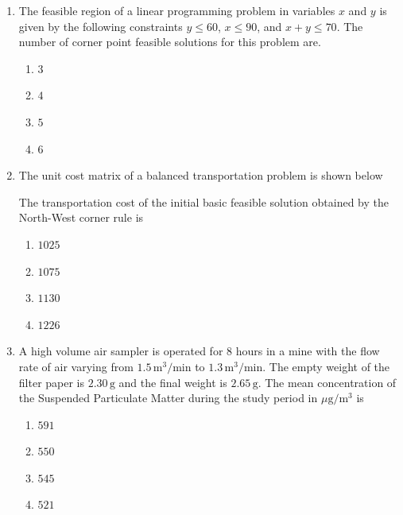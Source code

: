 \documentclass[journal,12pt,onecolumn]{IEEEtran}
\theoremstyle{remark}
\begin{document}
\begin{enumerate}
\item The feasible region of a linear programming problem in variables $x$ and $y$ is given by the following constraints  
$y \leq 60$, $x \leq 90$, and $x + y \leq 70$.
The number of corner point feasible solutions for this problem are.
\

\hfill{}

\begin{multicols}{4}
\begin{enumerate}
\item $3$
\item $4$
\item $5$
\item $6$
\end{enumerate}
\end{multicols}

\item The unit cost matrix of a balanced transportation problem is shown below
\begin{table}[H]
\centering

\end{table}
The transportation cost of the initial basic feasible solution obtained by the North-West corner rule is 

\hfill{}
\begin{multicols}{4}
\begin{enumerate}
\item $1025$
\item $1075$
\item $1130$
\item $1226$
\end{enumerate}
\end{multicols}

\item A high volume air sampler is operated for 8 hours in a mine with the flow rate of air varying from 
$1.5\, \mathrm{m}^3/\mathrm{min}$ to $1.3\, \mathrm{m}^3/\mathrm{min}$. The empty weight of the filter paper is 
$2.30\, \mathrm{g}$ and the final weight is $2.65\, \mathrm{g}$. The mean concentration of the Suspended 
Particulate Matter  during the study period in $\mu\mathrm{g}/\mathrm{m}^3$ is

\hfill{}
\begin{multicols}{4}
\begin{enumerate}
\item $591$
\item $550$
\item $ 545$
\item $ 521$
\end{enumerate}
\end{multicols}


\end{enumerate}
\end{document}
